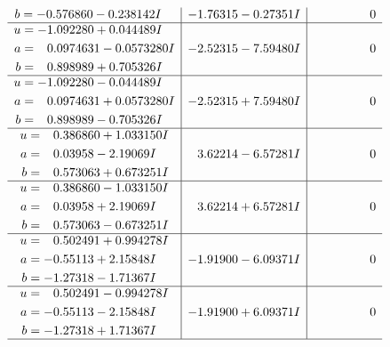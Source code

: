 \documentclass[1p]{elsarticle_modified}
\theoremstyle{definition}
\begin{document}
$$\begin{array}{c|c|c}
\begin{aligned}
b &= -0.576860 - 0.238142 I\end{aligned}
 & -1.76315 - 0.27351 I & \phantom{-0.000000 } 0 \\ \hline\begin{aligned}
u &= -1.092280 + 0.044489 I \\
a &= \phantom{-}0.0974631 - 0.0573280 I \\
b &= \phantom{-}0.898989 + 0.705326 I\end{aligned}
 & -2.52315 - 7.59480 I & \phantom{-0.000000 } 0 \\ \hline\begin{aligned}
u &= -1.092280 - 0.044489 I \\
a &= \phantom{-}0.0974631 + 0.0573280 I \\
b &= \phantom{-}0.898989 - 0.705326 I\end{aligned}
 & -2.52315 + 7.59480 I & \phantom{-0.000000 } 0 \\ \hline\begin{aligned}
u &= \phantom{-}0.386860 + 1.033150 I \\
a &= \phantom{-}0.03958 - 2.19069 I \\
b &= \phantom{-}0.573063 + 0.673251 I\end{aligned}
 & \phantom{-}3.62214 - 6.57281 I & \phantom{-0.000000 } 0 \\ \hline\begin{aligned}
u &= \phantom{-}0.386860 - 1.033150 I \\
a &= \phantom{-}0.03958 + 2.19069 I \\
b &= \phantom{-}0.573063 - 0.673251 I\end{aligned}
 & \phantom{-}3.62214 + 6.57281 I & \phantom{-0.000000 } 0 \\ \hline\begin{aligned}
u &= \phantom{-}0.502491 + 0.994278 I \\
a &= -0.55113 + 2.15848 I \\
b &= -1.27318 - 1.71367 I\end{aligned}
 & -1.91900 - 6.09371 I & \phantom{-0.000000 } 0 \\ \hline\begin{aligned}
u &= \phantom{-}0.502491 - 0.994278 I \\
a &= -0.55113 - 2.15848 I \\
b &= -1.27318 + 1.71367 I\end{aligned}
 & -1.91900 + 6.09371 I & \phantom{-0.000000 } 0\\
 \hline 
 \end{array}$$\newpage$$\begin{array}{c|c|c}  

\end{array}$$
\end{document}
